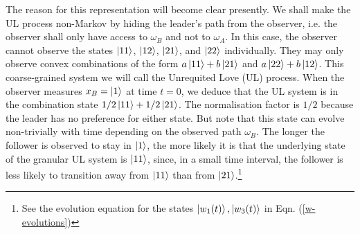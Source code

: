 The reason for this representation will become clear presently. We shall make the UL process non-Markov by hiding the leader's path from the observer, i.e. the observer shall only have access to $\omega_B$ and not to $\omega_A$. In this case, the observer cannot observe the states $\ket{11}$, $\ket{12}$, $\ket{21}$, and $\ket{22}$ individually. They may only observe convex combinations of the form $a\ket{11} + b\ket{21}$ and $a\ket{22} + b\ket{12}$. This coarse-grained system we will call the Unrequited Love (UL) process. When the observer measures $x_B = \ket{1}$ at time $t=0$, we deduce that the UL system is in the combination state $1/2 \ket{11} + 1/2 \ket{21}$. The normalisation factor is $1/2$ because the leader has no preference for either state. But note that this state can evolve non-trivially with time depending on the observed path $\omega_B$. The longer the follower is observed to stay in $\ket{1}$, the more likely it is that the underlying state of the granular UL system is $\ket{11}$, since, in a small time interval, the follower is less likely to transition away from $\ket{11}$ than from $\ket{21}$.\footnote{See the evolution equation for the states $\ket{w_1(t)}, \ket{w_3(t)}$ in Eqn. (\ref{w-evolutions})}

